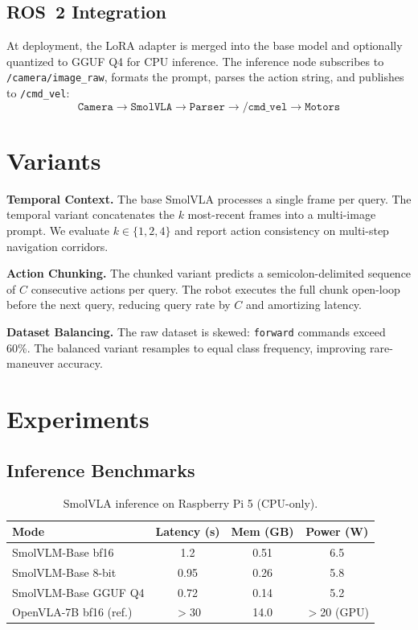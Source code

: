 \documentclass[conference]{IEEEtran}
\begin{document}
\subsection{ROS~2 Integration}
At deployment, the LoRA adapter is merged into the base model and optionally quantized to
GGUF Q4 for CPU inference. The inference node subscribes to \texttt{/camera/image\_raw},
formats the prompt, parses the action string, and publishes to \texttt{/cmd\_vel}:
\[
\texttt{Camera} \to \texttt{SmolVLA} \to \texttt{Parser} \to \texttt{/cmd\_vel} \to \texttt{Motors}
\]

\section{Variants}
\label{sec:variants}

\textbf{Temporal Context.}
The base SmolVLA processes a single frame per query. The temporal variant concatenates the
$k$ most-recent frames into a multi-image prompt. We evaluate $k \in \{1,2,4\}$ and report
action consistency on multi-step navigation corridors.

\textbf{Action Chunking.}
The chunked variant predicts a semicolon-delimited sequence of $C$ consecutive actions per
query. The robot executes the full chunk open-loop before the next query, reducing query
rate by $C$ and amortizing latency.

\textbf{Dataset Balancing.}
The raw dataset is skewed: \texttt{forward} commands exceed 60\%. The balanced variant
resamples to equal class frequency, improving rare-maneuver accuracy.

\section{Experiments}
\label{sec:experiments}

\subsection{Inference Benchmarks}

\begin{table}[h]
\centering
\caption{SmolVLA inference on Raspberry Pi 5 (CPU-only).}
\label{tab:benchmarks}
\begin{tabular}{lccc}
\toprule
Mode & Latency (s) & Mem (GB) & Power (W) \\
\midrule
SmolVLM-Base bf16    & 1.2  & 0.51 & 6.5 \\
SmolVLM-Base 8-bit   & 0.95 & 0.26 & 5.8 \\
SmolVLM-Base GGUF Q4 & 0.72 & 0.14 & 5.2 \\
\midrule
OpenVLA-7B bf16 (ref.) & $>$30 & 14.0 & $>$20 (GPU) \\
\bottomrule
\end{tabular}
\end{table}
\end{document}
